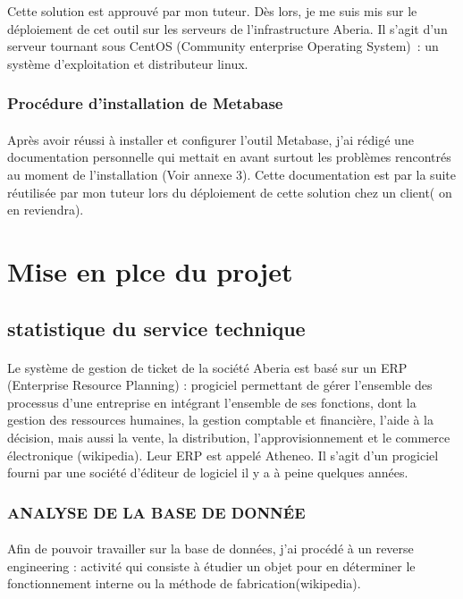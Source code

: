 \documentclass[a4paper,12pt]{report}
\begin{document}
               Cette solution est approuvé par mon tuteur.  Dès lors, je me suis mis sur le déploiement de cet outil sur les serveurs de l’infrastructure Aberia.  Il s’agit d’un serveur tournant sous CentOS (Community enterprise Operating System) : un système d’exploitation et  distributeur linux. 
      
\subsubsection{Procédure d’installation de Metabase}
\paragraph*{}           
           Après avoir réussi à installer et configurer l’outil Metabase, j’ai rédigé une documentation personnelle qui mettait en avant surtout les problèmes rencontrés au moment de l’installation (Voir annexe 3). Cette documentation est par la suite réutilisée par mon tuteur lors du déploiement de cette solution chez un client( on en reviendra). 
\section{Mise en plce du projet}

\subsection{statistique du service technique}
\paragraph*{}

Le système de gestion de ticket de la société Aberia est basé sur un ERP (Enterprise Resource Planning) : progiciel permettant de gérer l'ensemble des processus d'une entreprise en intégrant l'ensemble de ses fonctions, dont la gestion des ressources humaines, la gestion comptable et financière, l'aide à la décision, mais aussi la vente, la distribution, l'approvisionnement et le commerce électronique (wikipedia). Leur ERP est appelé Atheneo. Il s’agit d’un progiciel fourni par une société d'éditeur de logiciel il y a à peine quelques années. 

\subsubsection{ANALYSE DE LA BASE DE DONNÉE}

\paragraph*{}
                Afin de pouvoir travailler sur la base de données, j’ai procédé à un reverse engineering : activité qui consiste à étudier un objet pour en déterminer le fonctionnement interne ou la méthode de fabrication(wikipedia).\newline
               
\end{document}

